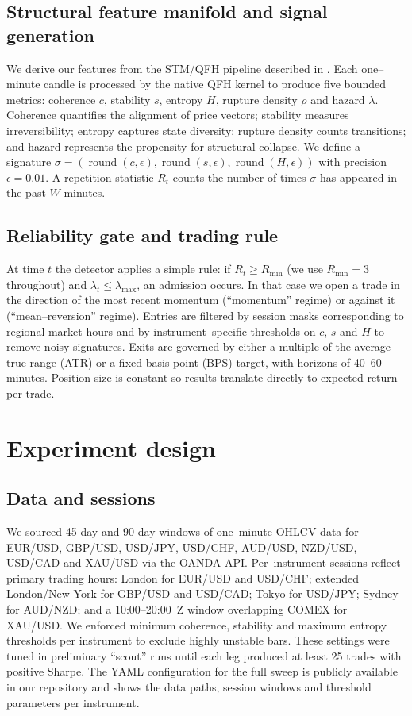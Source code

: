 \documentclass[11pt]{article}
\begin{document}
\subsection{Structural feature manifold and signal generation}
We derive our features from the STM/QFH pipeline described in
\cite{reference_stm}.  Each one–minute candle is processed by the
native QFH kernel to produce five bounded metrics: coherence $c$,
stability $s$, entropy $H$, rupture density $\rho$ and hazard
$\lambda$.  Coherence quantifies the alignment of price vectors; stability
measures irreversibility; entropy captures state diversity; rupture
density counts transitions; and hazard represents the propensity for
structural collapse.  We define a signature
$\sigma=(\operatorname{round}(c,\epsilon),\operatorname{round}(s,\epsilon),\operatorname{round}(H,\epsilon))$
with precision $\epsilon=0.01$.  A repetition statistic $R_t$ counts
the number of times $\sigma$ has appeared in the past $W$ minutes.

\subsection{Reliability gate and trading rule}
At time $t$ the detector applies a simple rule: if
$R_t\ge R_{\min}$ (we use $R_{\min}=3$ throughout) and
$\lambda_t \le \lambda_{\max}$, an admission occurs.  In that case
we open a trade in the direction of the most recent momentum
(``momentum'' regime) or against it (``mean–reversion'' regime).
Entries are filtered by session masks corresponding to regional
market hours and by instrument–specific thresholds on $c$, $s$ and
$H$ to remove noisy signatures.  Exits are governed by either a
multiple of the average true range (ATR) or a fixed basis point
(BPS) target, with horizons of 40–60 minutes.  Position size is
constant so results translate directly to expected return per trade.

\section{Experiment design}

\subsection{Data and sessions}
We sourced 45‐day and 90‐day windows of one–minute OHLCV data for
EUR/USD, GBP/USD, USD/JPY, USD/CHF, AUD/USD, NZD/USD, USD/CAD and
XAU/USD via the OANDA API.  Per–instrument sessions reflect
primary trading hours: London for EUR/USD and USD/CHF; extended
London/New York for GBP/USD and USD/CAD; Tokyo for USD/JPY; Sydney
for AUD/NZD; and a 10:00–20:00~Z window overlapping COMEX for
XAU/USD.  We enforced minimum coherence, stability and maximum
entropy thresholds per instrument to exclude highly unstable bars.
These settings were tuned in preliminary ``scout'' runs until each
leg produced at least 25 trades with positive Sharpe.  The YAML
configuration for the full sweep is publicly available in our
repository\cite{reference_config45} and shows the data paths,
session windows and threshold parameters per instrument\cite{reference_config90}.
\end{document}
